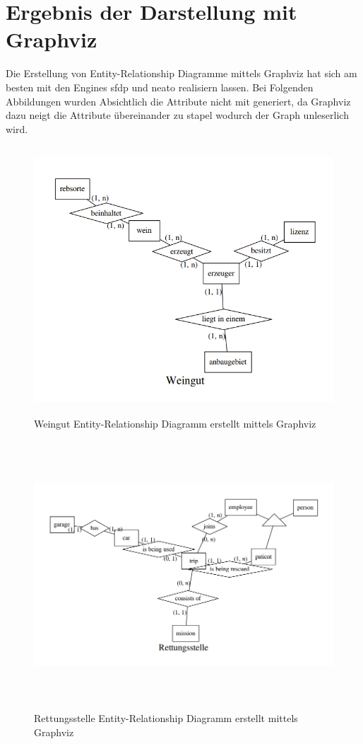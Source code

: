 \section{Ergebnis der Darstellung mit Graphviz}
\fib{}
\noindent
Die Erstellung von Entity-Relationship Diagramme mittels Graphviz hat sich am besten mit den Engines sfdp und neato realisiern lassen.
Bei Folgenden Abbildungen wurden Absichtlich die Attribute nicht mit generiert, da Graphviz dazu neigt die Attribute übereinander zu stapel wodurch der Graph unleserlich wird.

\begin{figure}[h]
	\begin{center}
		\includegraphics[width=14cm, height=10cm]{images/weingut_neato.png}
		\caption{Weingut Entity-Relationship Diagramm erstellt mittels Graphviz}
		\label{wein}
	\end{center}
\end{figure}
\begin{figure}[H]
	\begin{center}
		\includegraphics[width=14cm,height=10cm]{images/rettungsstelle_neato.png}
		\caption{Rettungsstelle Entity-Relationship Diagramm erstellt mittels Graphviz}
		\label{rettung}
	\end{center}
\end{figure}

